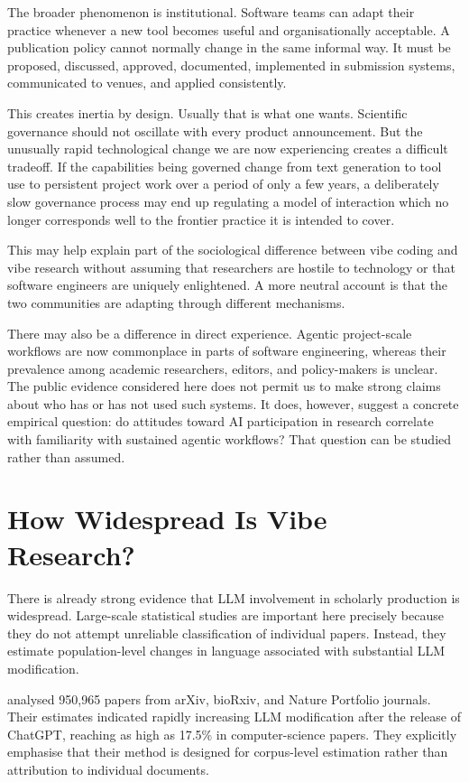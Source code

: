 \documentclass[12pt]{article}
\begin{document}
The broader phenomenon is institutional.
Software teams can adapt their practice whenever a new tool becomes useful and organisationally acceptable. A publication policy cannot normally change in the same informal way. It must be proposed, discussed, approved, documented, implemented in submission systems, communicated to venues, and applied consistently.

This creates inertia by design.
Usually that is what one wants. Scientific governance should not oscillate with every product announcement.
But the unusually rapid technological change we are now experiencing creates a difficult tradeoff. If the capabilities being governed change from text generation to tool use to persistent project work over a period of only a few years, a deliberately slow governance process may end up regulating a model of interaction which no longer corresponds well to the frontier practice it is intended to cover.

This may help explain part of the sociological difference between vibe coding and vibe research without assuming that researchers are hostile to technology or that software engineers are uniquely enlightened. A more neutral account is that the two communities are adapting through different mechanisms.

There may also be a difference in direct experience. Agentic project-scale workflows are now commonplace in parts of software engineering, whereas their prevalence among academic researchers, editors, and policy-makers is unclear. The public evidence considered here does not permit us to make strong claims about who has or has not used such systems.
It does, however, suggest a concrete empirical question: do attitudes toward AI participation in research correlate with familiarity with sustained agentic workflows?
That question can be studied rather than assumed.

\section{How Widespread Is Vibe Research?}

There is already strong evidence that LLM involvement in scholarly production is widespread.
Large-scale statistical studies are important here precisely because they do not attempt unreliable classification of individual papers. Instead, they estimate population-level changes in language associated with substantial LLM modification.

\citet{liangEtAl2024mapping} analysed 950,965 papers from arXiv, bioRxiv, and Nature Portfolio journals. Their estimates indicated rapidly increasing LLM modification after the release of ChatGPT, reaching as high as 17.5\% in computer-science papers. They explicitly emphasise that their method is designed for corpus-level estimation rather than attribution to individual documents.
\end{document}
